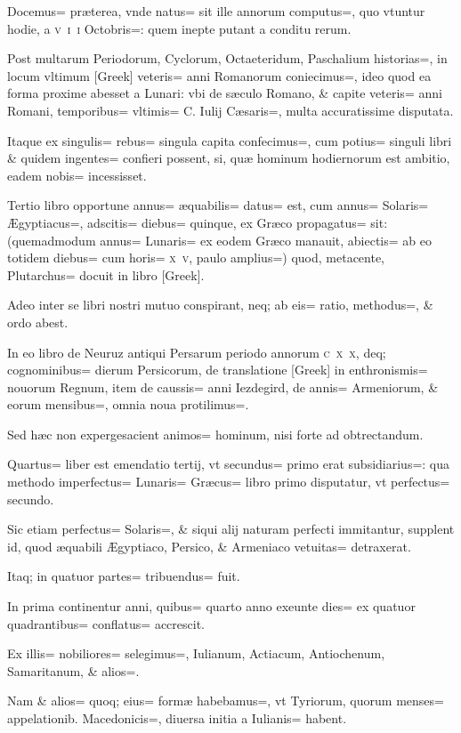 \begin{parnumbers}
Docemus= præterea, vnde natus= sit ille annorum computus=, quo vtuntur hodie, a \textsc{v~i~i} Octobris=: quem inepte putant a conditu rerum.

Post multarum Periodorum, Cyclorum, Octaeteridum, Paschalium historias=, in locum vltimum [Greek] veteris= anni Romanorum coniecimus=, ideo quod ea forma proxime abesset a Lunari: vbi de sæculo Romano, \& capite veteris= anni Romani, temporibus= vltimis= C. Iulij Cæsaris=, multa accuratissime disputata.

Itaque ex singulis= rebus= singula capita confecimus=, cum potius= singuli libri \& quidem ingentes= confieri possent, si, quæ hominum hodiernorum est ambitio, eadem nobis= incessisset.

Tertio libro opportune annus= æquabilis= datus= est, cum annus= Solaris= Ægyptiacus=, adscitis= diebus= quinque, ex Græco propagatus= sit: (quemadmodum annus= Lunaris= ex eodem Græco manauit, abiectis= ab eo totidem diebus= cum horis= \textsc{x~v}, paulo amplius=) quod, metacente, Plutarchus= docuit in libro [Greek].

Adeo inter se libri nostri mutuo conspirant, neq; ab eis= ratio, methodus=, \& ordo abest.

In eo libro de Neuruz antiqui Persarum periodo annorum \textsc{c~x~x}, deq; cognominibus= dierum Persicorum, de translatione [Greek] in enthronismis= nouorum Regnum, item de caussis= anni Iezdegird, de annis= Armeniorum, \& eorum mensibus=, omnia noua protilimus=. 

Sed hæc non expergesacient animos= hominum, nisi forte ad obtrectandum.

Quartus= liber est emendatio tertij, vt secundus= primo erat subsidiarius=: qua methodo imperfectus= Lunaris= Græcus= libro primo disputatur, vt perfectus= secundo.

Sic etiam perfectus= Solaris=, \& siqui alij naturam perfecti immitantur, supplent id, quod æquabili Ægyptiaco, Persico, \& Armeniaco vetuitas= detraxerat.

Itaq; in quatuor partes= tribuendus= fuit.

In prima continentur anni, quibus= quarto anno exeunte dies= ex quatuor quadrantibus= conflatus= accrescit.

Ex illis= nobiliores= selegimus=, Iulianum, Actiacum, Antiochenum, Samaritanum, \& alios=. 

Nam \& alios= quoq; eius= formæ habebamus=, vt Tyriorum, quorum menses= appelationib. Macedonicis=, diuersa initia a Iulianis= habent.


\end{parnumbers}
